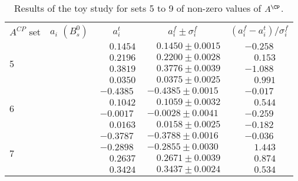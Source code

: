 \begin{table}[htbp]
\begin{center}
\caption[Results of the toy study for sets 5 to 9 of non-zero values of $A^{\CP}$]{\label{tab:NZACPs_AllsetsB} Results of the toy study for sets 5 to 9 of non-zero values of $A^{\CP}$.}
\vspace{5pt}
\begin{tabular}{l|c|c|c|c}
\multirow{2}{*}{$A^{C\!P}$ set}
 & \multirow{2}{*}{$a_i$ $(B^0_s)$} & \multirow{2}{*}{ $a_i^t $ } & \multirow{2}{*}{$a_i^f \pm \sigma_i^f $} & \multirow{2}{*}{$(a_i^f - a_i^t)/\sigma_i^f  $} \\
				&	       &	 					  &   &	\\	
\hline

 \multirow{4}{*}{5}	&	\ACPL 	&$	\phantom{-}0.1454	$&$	\phantom{-}0.1450		\pm		0.0015	$&$	-0.258	 $\\
	&	\ACPS 	&$	\phantom{-}0.2196	$&$	\phantom{-}0.2200		\pm		0.0028	$&$	\phantom{-}0.153	 $\\
	&	\ACPpa 	&$	\phantom{-}0.3819	$&$	\phantom{-}0.3776		\pm		0.0039	$&$	-1.088	 $\\
	&	\ACPpe 	&$	\phantom{-}0.0350	$&$	\phantom{-}0.0375		\pm		0.0025	$&$	\phantom{-}0.991	 $\\
													
\hline													
													
 \multirow{4}{*}{6}	&	\ACPL 	&$	-0.4385	$&$	-0.4385		\pm		0.0015	$&$	-0.017	 $\\
	&	\ACPS 	&$	\phantom{-}0.1042	$&$	\phantom{-}0.1059		\pm		0.0032	$&$	\phantom{-}0.544	 $\\
	&	\ACPpa 	&$	-0.0017	$&$	-0.0028		\pm		0.0041	$&$	-0.259	 $\\
	&	\ACPpe 	&$	\phantom{-}0.0163	$&$	\phantom{-}0.0158		\pm		0.0025	$&$	-0.182	 $\\
													
\hline													
													
 \multirow{4}{*}{7}	&	\ACPL 	&$	-0.3787	$&$	-0.3788		\pm		0.0016	$&$	-0.036	 $\\
	&	\ACPS 	&$	-0.2898	$&$	-0.2855		\pm		0.0030	$&$	\phantom{-}1.443	 $\\
	&	\ACPpa 	&$	\phantom{-}0.2637	$&$	\phantom{-}0.2671		\pm		0.0039	$&$	\phantom{-}0.874	 $\\
	&	\ACPpe 	&$	\phantom{-}0.3424	$&$	\phantom{-}0.3437		\pm		0.0024	$&$	\phantom{-}0.534	 $\\
													

\end{tabular}
\end{center}
\end{table}

